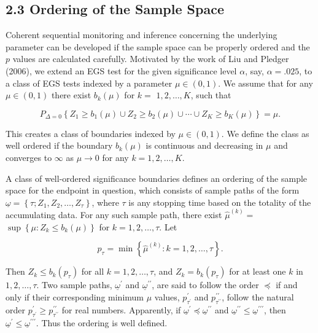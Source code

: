 \documentclass[10pt]{article}
\begin{document}
\subsection*{2.3 Ordering of the Sample Space}
Coherent sequential monitoring and inference concerning the underlying parameter can be developed if the sample space can be properly ordered and the $p$ values are calculated carefully. Motivated by the work of Liu and Pledger (2006), we extend an EGS test for the given significance level $\alpha$, say, $\alpha=.025$, to a class of EGS tests indexed by a parameter $\mu \in(0,1)$. We assume that for any $\mu \in(0,1)$ there exist $b_{k}(\mu)$ for $k=$ $1,2, \ldots, K$, such that


\begin{equation*}
P_{\Delta=0}\left\{Z_{1} \geq b_{1}(\mu) \cup Z_{2} \geq b_{2}(\mu) \cup \cdots \cup Z_{K} \geq b_{K}(\mu)\right\}=\mu . \tag{4}
\end{equation*}


This creates a class of boundaries indexed by $\mu \in(0,1)$. We define the class as well ordered if the boundary $b_{k}(\mu)$ is continuous and decreasing in $\mu$ and converges to $\infty$ as $\mu \rightarrow 0$ for any $k=1,2, \ldots, K$.

A class of well-ordered significance boundaries defines an ordering of the sample space for the endpoint in question, which consists of sample paths of the form $\underline{\omega}=\left\{\tau ; Z_{1}, Z_{2}, \ldots, Z_{\tau}\right\}$, where $\tau$ is any stopping time based on the totality of the accumulating data. For any such sample path, there exist $\hat{\mu}^{(k)}=$ $\sup \left\{\mu: Z_{k} \leq b_{k}(\mu)\right\}$ for $k=1,2, \ldots, \tau$. Let


\begin{equation*}
p_{\tau}=\min \left\{\hat{\mu}^{(k)}: k=1,2, \ldots, \tau\right\} . \tag{5}
\end{equation*}


Then $Z_{k} \leq b_{k}\left(p_{\tau}\right)$ for all $k=1,2, \ldots, \tau$, and $Z_{k}=b_{k}\left(p_{\tau}\right)$ for at least one $k$ in $1,2, \ldots, \tau$. Two sample paths, $\underline{\omega}^{\prime}$ and $\underline{\omega}^{\prime \prime}$, are said to follow the order $\preceq$ if and only if their corresponding minimum $\mu$ values, $p_{\tau^{\prime}}^{\prime}$ and $p_{\tau^{\prime \prime}}^{\prime \prime}$, follow the natural order $p_{\tau^{\prime}}^{\prime} \geq p_{\tau^{\prime \prime}}^{\prime \prime}$ for real numbers. Apparently, if $\underline{\omega}^{\prime} \preceq \underline{\omega}^{\prime \prime}$ and $\underline{\omega}^{\prime \prime} \leq \underline{\omega}^{\prime \prime \prime}$, then $\underline{\omega}^{\prime} \leq \underline{\omega}^{\prime \prime \prime}$. Thus the ordering is well defined.
\end{document}
